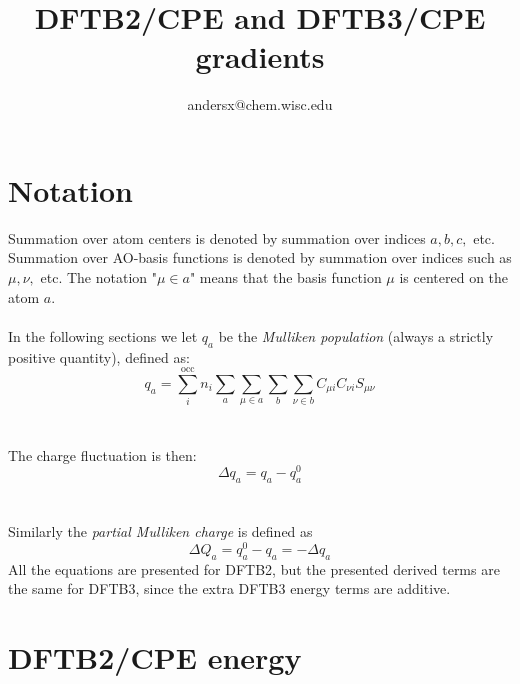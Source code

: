 \documentclass{article}
\title{DFTB2/CPE and DFTB3/CPE gradients}
\author{andersx@chem.wisc.edu}
\numberwithin{equation}{section}
\begin{document}
\section{Notation}
Summation over atom centers is denoted by summation over indices $a, b, c,$ etc. Summation over AO-basis functions is denoted by summation over indices such as $\mu, \nu,$ etc. The notation "$\mu \in a$" means that the basis function $\mu$ is centered on the atom $a$.
\\\\In the following sections we let $q_a$ be the \textit{Mulliken population} (always a strictly positive quantity), defined as:
\begin{equation}
    q_a = \sum_i^\mathrm{occ} n_i \sum_a \sum_{\mu \in a} \sum_b \sum_{\nu \in b}
    C_{\mu i} C_{\nu i} S_{\mu\nu}
\end{equation}
\\\\The charge fluctuation is then: 
\begin{equation}
    \Delta q_a = q_a - q_a^0
\end{equation}
\\\\Similarly the \textit{partial Mulliken charge} is defined as 
\begin{equation}
    \Delta Q_a = q_a^0 - q_a = - \Delta q_a
\end{equation}
All the equations are presented for DFTB2, but the presented derived terms are the same for DFTB3, since the extra DFTB3 energy terms are additive.

\section{DFTB2/CPE energy}
\end{document}
